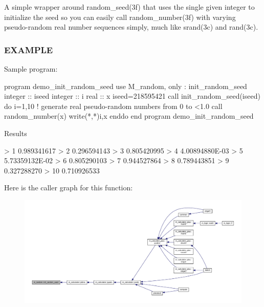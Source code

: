 A simple wrapper around random\+\_\+seed(3f) that uses the single given integer to initialize the seed so you can easily call random\+\_\+number(3f) with varying pseudo-\/random real number sequences simply, much like srand(3c) and rand(3c). \subsubsection*{E\+X\+A\+M\+P\+LE}

\begin{DoxyVerb}Sample program:

 program demo_init_random_seed
 use M_random, only : init_random_seed
 integer :: iseed
 integer :: i
 real    :: x
    iseed=218595421
    call init_random_seed(iseed)
    do i=1,10
       ! generate real pseudo-random numbers from 0 to <1.0
       call random_number(x)
       write(*,*)i,x
    enddo
 end program demo_init_random_seed

Results

  >     1  0.989341617
  >     2  0.296594143
  >     3  0.805420995
  >     4   4.00894880E-03
  >     5   5.73359132E-02
  >     6  0.805290103
  >     7  0.944527864
  >     8  0.789443851
  >     9  0.327288270
  >    10  0.710926533 \end{DoxyVerb}
 Here is the caller graph for this function\+:
\nopagebreak
\begin{figure}[H]
\begin{center}
\leavevmode
\includegraphics[width=350pt]{namespacem__random_af867f4abf9b4006b89e0ca160fc1b61a_icgraph}
\end{center}
\end{figure}
\mbox{\label{namespacem__random_a6e3975f994c77778043f3e5d00614317}} 
